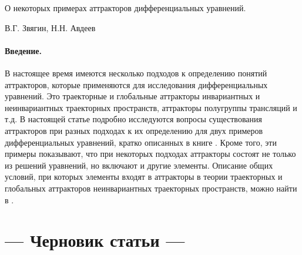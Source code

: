 
\LARGE




О некоторых примерах аттракторов дифференциальных уравнений.

                                   В.Г. Звягин, Н.Н. Авдеев

\paragraph{Введение.}
В настоящее время имеются несколько подходов к определению понятий аттракторов,
которые применяются для исследования дифференциальных уравнений.
Это траекторные и глобальные аттракторы инвариантных и неинвариантных траекторных пространств,
аттракторы полугруппы трансляций и т.д.
В настоящей статье подробно исследуются вопросы существования аттракторов
при разных подходах к их определению для двух примеров дифференциальных уравнений,
кратко описанных в книге \cite{Vorotnikov}.
Кроме того, эти примеры показывают, что при некоторых подходах аттракторы состоят не только из решений уравнений,
но включают и другие элементы.
Описание общих условий,
при которых элементы входят в аттракторы в теории траекторных и глобальных аттракторов неинвариантных траекторных пространств,
можно найти в \cite{Kondratyev}.

\section*{--- Черновик статьи ---}




